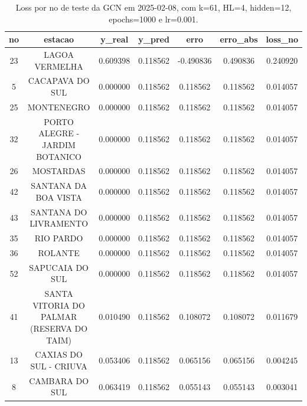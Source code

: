\begin{table}[h]
\centering
\caption{Loss por no de teste da GCN em 2025-02-08, com k=61, HL=4, hidden=12, epochs=1000 e lr=0.001.}
\label{tab:gcn_loss_k61_hl4_h12_e1000_d20250208}
\begin{tabular}{ccccccc}
\toprule
no & estacao & y\_real & y\_pred & erro & erro\_abs & loss\_no \\
\midrule
23 & LAGOA VERMELHA & 0.609398 & 0.118562 & -0.490836 & 0.490836 & 0.240920 \\
5 & CACAPAVA DO SUL & 0.000000 & 0.118562 & 0.118562 & 0.118562 & 0.014057 \\
25 & MONTENEGRO & 0.000000 & 0.118562 & 0.118562 & 0.118562 & 0.014057 \\
32 & PORTO ALEGRE - JARDIM BOTANICO & 0.000000 & 0.118562 & 0.118562 & 0.118562 & 0.014057 \\
26 & MOSTARDAS & 0.000000 & 0.118562 & 0.118562 & 0.118562 & 0.014057 \\
42 & SANTANA DA BOA VISTA & 0.000000 & 0.118562 & 0.118562 & 0.118562 & 0.014057 \\
43 & SANTANA DO LIVRAMENTO & 0.000000 & 0.118562 & 0.118562 & 0.118562 & 0.014057 \\
35 & RIO PARDO & 0.000000 & 0.118562 & 0.118562 & 0.118562 & 0.014057 \\
36 & ROLANTE & 0.000000 & 0.118562 & 0.118562 & 0.118562 & 0.014057 \\
52 & SAPUCAIA DO SUL & 0.000000 & 0.118562 & 0.118562 & 0.118562 & 0.014057 \\
41 & SANTA VITORIA DO PALMAR (RESERVA DO TAIM) & 0.010490 & 0.118562 & 0.108072 & 0.108072 & 0.011679 \\
13 & CAXIAS DO SUL - CRIUVA & 0.053406 & 0.118562 & 0.065156 & 0.065156 & 0.004245 \\
8 & CAMBARA DO SUL & 0.063419 & 0.118562 & 0.055143 & 0.055143 & 0.003041 \\
\bottomrule
\end{tabular}
\end{table}
